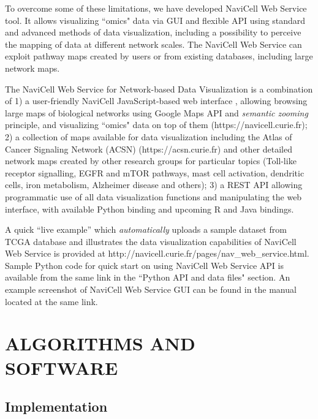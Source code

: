 \documentclass[a4,center,fleqn]{NAR}
\begin{document}
To overcome some of these limitations, we have developed NaviCell Web Service tool. It allows
visualizing ``omics" data via GUI and flexible API using standard and advanced
methods of data visualization, including a possibility to perceive the mapping of data
at different network scales. The NaviCell Web Service can 
exploit pathway maps created by users or from existing databases,
including large network maps.


\enlargethispage{-65.1pt}

The NaviCell Web Service for Network-based Data
Visualization is a combination of 1) a user-friendly NaviCell JavaScript-based
web interface \cite{kuperstein2013navicell}, allowing browsing large maps
of biological networks using Google Maps API and \emph{semantic zooming}
principle, and visualizing ``omics" data on top of them
(https://navicell.curie.fr); 2) a collection of maps available for
data visualization including the Atlas of Cancer Signaling Network (ACSN)
(https://acsn.curie.fr)  and other detailed network maps created by other
research groups for particular topics (Toll-like receptor signalling, EGFR
and mTOR pathways, mast cell activation, dendritic cells, iron metabolism,
Alzheimer disease and others); 3) a REST API allowing programmatic use of all
data visualization functions and manipulating the web interface, with available
Python binding and upcoming R and Java bindings.

A quick ``live example'' which \emph{automatically} uploads a sample dataset from
TCGA database and illustrates the data visualization capabilities of
NaviCell Web Service is provided at
http://navicell.curie.fr/pages/nav\_web\_service.html. Sample Python
code for quick start on using NaviCell Web Service API is available from the
same link in the ``Python API and data files" section. An example screenshot of NaviCell
Web Service GUI can be found in the manual located at the same link.

\section{ALGORITHMS AND SOFTWARE}

\subsection{Implementation}
\end{document}
